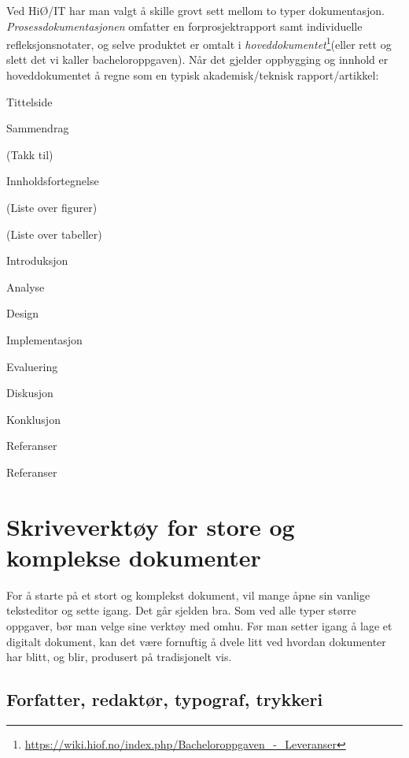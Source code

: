 Ved HiØ/IT har man valgt å skille grovt sett mellom to typer dokumentasjon.
{\em Prosessdokumentasjonen} omfatter en forprosjektrapport samt individuelle refleksjonsnotater, og selve produktet er omtalt i
{\em hoveddokumentet}\footnote{\url{https://wiki.hiof.no/index.php/Bacheloroppgaven_-_Leveranser}}(eller rett og slett det vi kaller bacheloroppgaven).
Når det gjelder oppbygging og innhold er hoveddokumentet å regne som en typisk akademisk/teknisk rapport/artikkel:

\begin{compactitem}
\item Tittelside
\item Sammendrag
\item (Takk til)
\item Innholdsfortegnelse
\item (Liste over figurer)
\item (Liste over tabeller)
\item Introduksjon
\item Analyse
\item Design
\item Implementasjon
\item Evaluering
\item Diskusjon
\item Konklusjon
\item Referanser
\item Referanser
\end{compactitem}

\section{Skriveverktøy for store og komplekse dokumenter}

For å starte på et stort og komplekst dokument, vil mange åpne sin vanlige teksteditor og sette igang. Det går sjelden bra. Som ved alle typer større oppgaver, bør man velge sine verktøy med omhu.
Før man setter igang å lage et digitalt dokument, kan det være fornuftig å dvele litt ved hvordan dokumenter har blitt, og blir, produsert på tradisjonelt vis. 

\subsection{Forfatter, redaktør, typograf, trykkeri}

